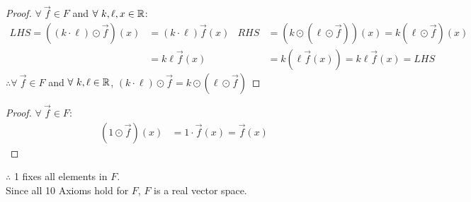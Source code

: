 \begin{enumerate}
  \begin{proof}
    $\forall~\vec{f} \in F$ and $\forall~k, \ell, x \in \mathbb{R}$:
    \begin{align*}
      LHS = ((k \cdot \ell) \odot \vec{f})(x) & = (k \cdot \ell)\vec{f}(x) & RHS & = (k \odot (\ell \odot \vec{f}))(x) = k(\ell \odot \vec{f})(x) \\
                                              & = k\ell\vec{f}(x)          &     & = k(\ell\vec{f}(x)) = k\ell\vec{f}(x) = LHS
    \end{align*}
    $\therefore \forall~\vec{f} \in F$ and $\forall~k, \ell \in \mathbb{R}$, $(k \cdot \ell) \odot \vec{f} = k \odot (\ell \odot \vec{f})$
  \end{proof}
  \begin{proof}
    $\forall~\vec{f} \in F$:
    \begin{align*}
      (1 \odot \vec{f})(x) & = 1\cdot\vec{f}(x) = \vec{f}(x)
    \end{align*}
  \end{proof}
  $\therefore$ 1 fixes all elements in $F$. \\
  Since all 10 Axioms hold for $F$, $F$ is a real vector space.
\end{enumerate}

